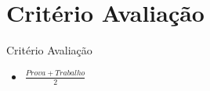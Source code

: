 \section*{Critério Avaliação}

\begin{frame}
\begin{block}{Critério Avaliação}
	 \begin{itemize}
			  \item $\frac{Prova + Trabalho}{2}$
	 \end{itemize}
\end{block}
\end{frame}
